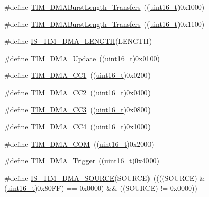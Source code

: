 \begin{DoxyCompactItemize}
\#define \hyperlink{group___t_i_m___d_m_a___burst___length_ga5b2c97f650a3c1726965187d852b8cc5}{T\+I\+M\+\_\+\+D\+M\+A\+Burst\+Length\+\_\+Transfers}~((\hyperlink{_p_e___types_8h_a1f1825b69244eb3ad2c7165ddc99c956}{uint16\+\_\+t})0x1000)
\item 
\#define \hyperlink{group___t_i_m___d_m_a___burst___length_gaed9f2afef174079f6eb6927abd995b9b}{T\+I\+M\+\_\+\+D\+M\+A\+Burst\+Length\+\_\+Transfers}~((\hyperlink{_p_e___types_8h_a1f1825b69244eb3ad2c7165ddc99c956}{uint16\+\_\+t})0x1100)
\item 
\#define \hyperlink{group___t_i_m___d_m_a___burst___length_gafd09cf0887b01a15101ba7dd6e2b4ba7}{I\+S\+\_\+\+T\+I\+M\+\_\+\+D\+M\+A\+\_\+\+L\+E\+N\+G\+TH}(L\+E\+N\+G\+TH)
\item 
\#define \hyperlink{group___t_i_m___d_m_a__sources_ga013a49e5cceb263f01941aef968dea9c}{T\+I\+M\+\_\+\+D\+M\+A\+\_\+\+Update}~((\hyperlink{_p_e___types_8h_a1f1825b69244eb3ad2c7165ddc99c956}{uint16\+\_\+t})0x0100)
\item 
\#define \hyperlink{group___t_i_m___d_m_a__sources_ga33b93e8bb82fe8e167b9e9c962c54f83}{T\+I\+M\+\_\+\+D\+M\+A\+\_\+\+C\+C1}~((\hyperlink{_p_e___types_8h_a1f1825b69244eb3ad2c7165ddc99c956}{uint16\+\_\+t})0x0200)
\item 
\#define \hyperlink{group___t_i_m___d_m_a__sources_ga792f73196a8e7424655592097d7a3fd5}{T\+I\+M\+\_\+\+D\+M\+A\+\_\+\+C\+C2}~((\hyperlink{_p_e___types_8h_a1f1825b69244eb3ad2c7165ddc99c956}{uint16\+\_\+t})0x0400)
\item 
\#define \hyperlink{group___t_i_m___d_m_a__sources_ga3eb2dadbd3109bced45935fb53deeee1}{T\+I\+M\+\_\+\+D\+M\+A\+\_\+\+C\+C3}~((\hyperlink{_p_e___types_8h_a1f1825b69244eb3ad2c7165ddc99c956}{uint16\+\_\+t})0x0800)
\item 
\#define \hyperlink{group___t_i_m___d_m_a__sources_ga59495cf79894dfe5e5b2029863aed956}{T\+I\+M\+\_\+\+D\+M\+A\+\_\+\+C\+C4}~((\hyperlink{_p_e___types_8h_a1f1825b69244eb3ad2c7165ddc99c956}{uint16\+\_\+t})0x1000)
\item 
\#define \hyperlink{group___t_i_m___d_m_a__sources_gac5f4c56e944bda8ba0c23b97275020ba}{T\+I\+M\+\_\+\+D\+M\+A\+\_\+\+C\+OM}~((\hyperlink{_p_e___types_8h_a1f1825b69244eb3ad2c7165ddc99c956}{uint16\+\_\+t})0x2000)
\item 
\#define \hyperlink{group___t_i_m___d_m_a__sources_ga81ad169a378969524e61396337d84a0a}{T\+I\+M\+\_\+\+D\+M\+A\+\_\+\+Trigger}~((\hyperlink{_p_e___types_8h_a1f1825b69244eb3ad2c7165ddc99c956}{uint16\+\_\+t})0x4000)
\item 
\#define \hyperlink{group___t_i_m___d_m_a__sources_gafb9cb1995ea4cd37db6032d80a49cd47}{I\+S\+\_\+\+T\+I\+M\+\_\+\+D\+M\+A\+\_\+\+S\+O\+U\+R\+CE}(S\+O\+U\+R\+CE)~((((S\+O\+U\+R\+CE) \& (\hyperlink{_p_e___types_8h_a1f1825b69244eb3ad2c7165ddc99c956}{uint16\+\_\+t})0x80\+F\+F) == 0x0000) \&\& ((\+S\+O\+U\+R\+C\+E) != 0x0000))

\end{DoxyCompactItemize}
